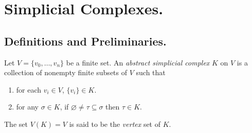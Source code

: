 
\usepackage{csquotes}
\usepackage[style=verbose-ibid,backend=bibtex]{biblatex}


\usepackage{scalerel,stmaryrd}
\newsavebox\wedgearrowbaseline
\savebox{}
\newcommand{\wedgearrow}{\mathrel{\scalerel*{%
  \usebox{\wedgearrowbaseline}}{X}}} %

\rhead{\today}



\section{Simplicial Complexes.}

\subsection{Definitions and Preliminaries.}

\begin{definition}
    Let $V = \{v_0, \dots, v_n\}$ be a finite set. An \emph{abstract simplicial complex} $K$ on $V$ is a collection of nonempty
    finite subsets of $V$ such that
    \begin{enumerate}
        \item for each $v_i \in V$, $\{v_i\} \in K$.
        \item for any $\sigma \in K$, if $\varnothing \neq \tau \subseteq \sigma$ then $\tau \in K$.
    \end{enumerate}
    The set $V(K) = V$ is said to be the \emph{vertex} set of $K$.
\end{definition}

